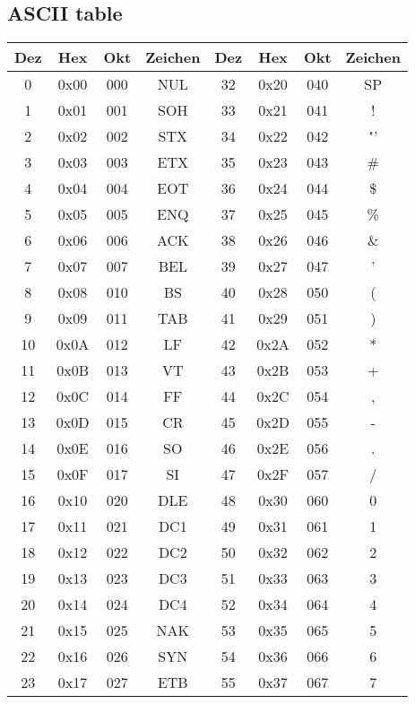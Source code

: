 \documentclass[a4paper]{scrartcl}
\begin{document}
    \subsection{ASCII table}
        \begin{longtable}{|c|c|c|c||c|c|c|c|}
        \hline
        Dez & Hex & Okt & Zeichen & Dez & Hex & Okt & Zeichen\\
        \hline
        0 & 0x00 & 000 & NUL & 32 & 0x20 & 040 & SP\\
        1 & 0x01 & 001 & SOH & 33 & 0x21 & 041 & ! \\
        2 & 0x02 & 002 & STX & 34 & 0x22 & 042 & "'\\
        3 & 0x03 & 003 & ETX & 35 & 0x23 & 043 & \# \\
        4 & 0x04 & 004 & EOT & 36 & 0x24 & 044 & \$ \\
        5 & 0x05 & 005 & ENQ & 37 & 0x25 & 045 & \% \\
        6 & 0x06 & 006 & ACK & 38 & 0x26 & 046 & \& \\
        7 & 0x07 & 007 & BEL & 39 & 0x27 & 047 & ' \\
        8 & 0x08 & 010 & BS & 40 & 0x28 & 050 & (  \\
        9 & 0x09 & 011 & TAB & 41 & 0x29 & 051 &  ) \\
        10 & 0x0A & 012 & LF & 42 & 0x2A & 052 & * \\
        11 & 0x0B & 013 & VT & 43 & 0x2B & 053 & + \\
        12 & 0x0C & 014 & FF & 44 & 0x2C & 054 & , \\
        13 & 0x0D & 015 & CR & 45 & 0x2D & 055 & - \\
        14 & 0x0E & 016 & SO & 46 & 0x2E & 056 & . \\
        15 & 0x0F & 017 & SI & 47 & 0x2F & 057 & / \\
        16 & 0x10 & 020 & DLE & 48 & 0x30 & 060 & 0 \\
        17 & 0x11 & 021 & DC1 & 49 & 0x31 & 061 & 1 \\
        18 & 0x12 & 022 & DC2 & 50 & 0x32 & 062 & 2 \\
        19 & 0x13 & 023 & DC3 & 51 & 0x33 & 063 & 3 \\
        20 & 0x14 & 024 & DC4 & 52 & 0x34 & 064 & 4 \\
        21 & 0x15 & 025 & NAK & 53 & 0x35 & 065 & 5 \\
        22 & 0x16 & 026 & SYN & 54 & 0x36 & 066 & 6 \\
        23 & 0x17 & 027 & ETB & 55 & 0x37 & 067 & 7 \\

\end{longtable}
\end{document}

